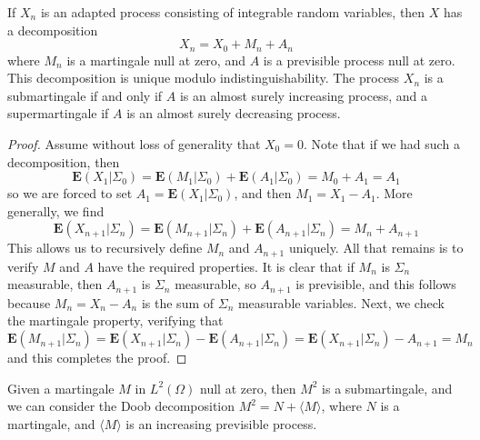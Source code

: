 \begin{theorem}
    If $X_n$ is an adapted process consisting of integrable random variables, then $X$ has a decomposition
    \[ X_n = X_0 + M_n + A_n \]
    where $M_n$ is a martingale null at zero, and $A$ is a previsible process null at zero. This decomposition is unique modulo indistinguishability. The process $X_n$ is a submartingale if and only if $A$ is an almost surely increasing process, and a supermartingale if $A$ is an almost surely decreasing process.
\end{theorem}
\begin{proof}
    Assume without loss of generality that $X_0 = 0$. Note that if we had such a decomposition, then
    \[ \mathbf{E}(X_1|\Sigma_0) = \mathbf{E}(M_1|\Sigma_0) + \mathbf{E}(A_1|\Sigma_0) = M_0 + A_1 = A_1 \]
    so we are forced to set $A_1 = \mathbf{E}(X_1|\Sigma_0)$, and then $M_1 = X_1 - A_1$. More generally, we find
    \[ \mathbf{E}(X_{n+1}|\Sigma_n) = \mathbf{E}(M_{n+1}|\Sigma_n) + \mathbf{E}(A_{n+1}|\Sigma_n) = M_n + A_{n+1} \]
    This allows us to recursively define $M_n$ and $A_{n+1}$ uniquely. All that remains is to verify $M$ and $A$ have the required properties. It is clear that if $M_n$ is $\Sigma_n$ measurable, then $A_{n+1}$ is $\Sigma_n$ measurable, so $A_{n+1}$ is previsible, and this follows because $M_n = X_n - A_n$ is the sum of $\Sigma_n$ measurable variables. Next, we check the martingale property, verifying that
    \[ \mathbf{E}(M_{n+1}|\Sigma_n) = \mathbf{E}(X_{n+1}|\Sigma_n) - \mathbf{E}(A_{n+1}|\Sigma_n) = \mathbf{E}(X_{n+1}|\Sigma_n) - A_{n+1} = M_n \]
    and this completes the proof.
\end{proof}

Given a martingale $M$ in $L^2(\Omega)$ null at zero, then $M^2$ is a submartingale, and we can consider the Doob decomposition $M^2 = N + \langle M \rangle$, where $N$ is a martingale, and $\langle M \rangle$ is an increasing previsible process.

